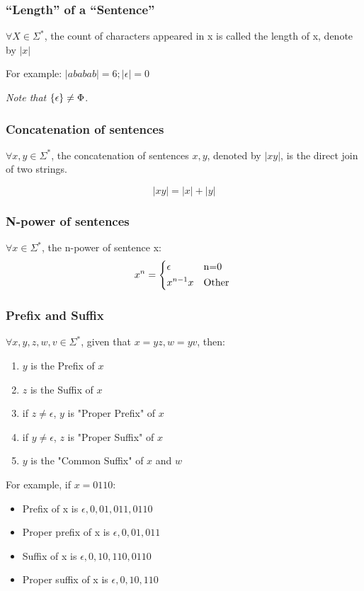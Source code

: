 \documentclass{ctexart}
\DeclarePairedDelimiter{\set}{\{}{\}}
\begin{document}
\subsubsection{``Length'' of a ``Sentence''}

$\forall X \in \Sigma^*$, the count of characters appeared in x is called the length of x, denote by $\left|x\right|$

For example: $\left|ababab\right| = 6; \left|\epsilon\right| = 0$ 

\emph{Note that $\set*{\epsilon} \neq \Phi$}.

\subsubsection{Concatenation of sentences}
$\forall x, y \in \Sigma^*$, the concatenation of sentences $x, y$, denoted by $|xy|$, is the direct join of two strings.

$$
\left|xy\right| = |x| + |y|
$$

\subsubsection{N-power of sentences}
$\forall x \in \Sigma^*$, the n-power of sentence x:
$$
x^n = \begin{dcases*}
\epsilon & n=0 \\
x^{n-1}x & Other \\
\end{dcases*}
$$

\subsubsection{Prefix and Suffix}
$\forall x,y,z,w,v \in \Sigma^*$, given that $x=yz, w=yv$, then:
\begin{enumerate}
	\item $y$ is the Prefix of $x$
	\item $z$ is the Suffix of $x$
	\item if $z \neq \epsilon$, $y$ is "Proper Prefix" of $x$
	\item if $y \neq \epsilon$, $z$ is "Proper Suffix" of $x$
	\item $y$ is the "Common Suffix" of $x$ and $w$
\end{enumerate}
For example, if $x = 0110$:
\begin{itemize}
	\item Prefix of x is $\epsilon, 0, 01, 011, 0110$
	\item Proper prefix of x is $\epsilon, 0, 01, 011$
	\item Suffix of x is $\epsilon, 0, 10, 110, 0110$
	\item Proper suffix of x is $\epsilon, 0, 10, 110$
\end{itemize}
\end{document}
